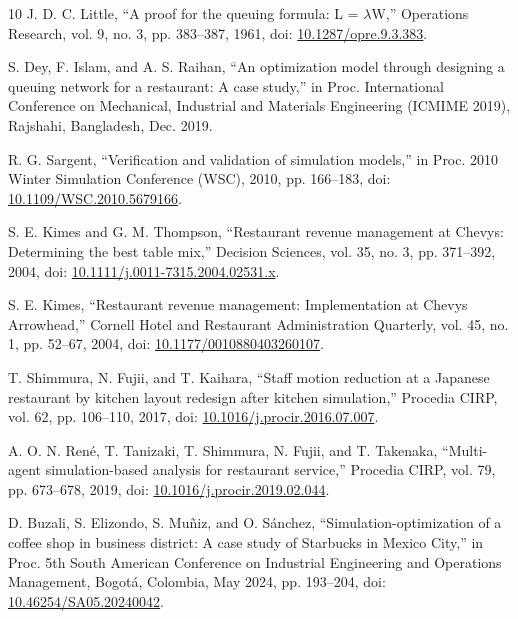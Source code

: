 \documentclass[10pt,a4paper,twocolumn]{article}
\begin{document}
\begin{thebibliography}{10}
 J. D. C. Little, “A proof for the queuing formula: L = \(\lambda\)W,” Operations Research, vol. 9, no. 3, pp. 383–387, 1961, doi: \href{https://doi.org/10.1287/opre.9.3.383}{10.1287/opre.9.3.383}.

 S. Dey, F. Islam, and A. S. Raihan, “An optimization model through designing a queuing network for a restaurant: A case study,” in Proc. International Conference on Mechanical, Industrial and Materials Engineering (ICMIME 2019), Rajshahi, Bangladesh, Dec. 2019.

 R. G. Sargent, “Verification and validation of simulation models,” in Proc. 2010 Winter Simulation Conference (WSC), 2010, pp. 166–183, doi: \href{https://doi.org/10.1109/WSC.2010.5679166}{10.1109/WSC.2010.5679166}.

 S. E. Kimes and G. M. Thompson, “Restaurant revenue management at Chevys: Determining the best table mix,” Decision Sciences, vol. 35, no. 3, pp. 371–392, 2004, doi: \href{https://doi.org/10.1111/j.0011-7315.2004.02531.x}{10.1111/j.0011-7315.2004.02531.x}.

 S. E. Kimes, “Restaurant revenue management: Implementation at Chevys Arrowhead,” Cornell Hotel and Restaurant Administration Quarterly, vol. 45, no. 1, pp. 52–67, 2004, doi: \href{https://doi.org/10.1177/0010880403260107}{10.1177/0010880403260107}.

 T. Shimmura, N. Fujii, and T. Kaihara, “Staff motion reduction at a Japanese restaurant by kitchen layout redesign after kitchen simulation,” Procedia CIRP, vol. 62, pp. 106–110, 2017, doi: \href{https://doi.org/10.1016/j.procir.2016.07.007}{10.1016/j.procir.2016.07.007}.

 A. O. N. René, T. Tanizaki, T. Shimmura, N. Fujii, and T. Takenaka, “Multi-agent simulation-based analysis for restaurant service,” Procedia CIRP, vol. 79, pp. 673–678, 2019, doi: \href{https://doi.org/10.1016/j.procir.2019.02.044}{10.1016/j.procir.2019.02.044}.

 D. Buzali, S. Elizondo, S. Muñiz, and O. Sánchez, “Simulation-optimization of a coffee shop in business district: A case study of Starbucks in Mexico City,” in Proc. 5th South American Conference on Industrial Engineering and Operations Management, Bogotá, Colombia, May 2024, pp. 193–204, doi: \href{https://doi.org/10.46254/SA05.20240042}{10.46254/SA05.20240042}.


\end{thebibliography}
\end{document}
